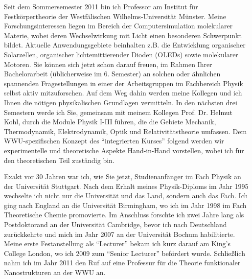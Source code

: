 \begin{multicols}{2}
Seit dem Sommersemester 2011 bin ich Professor am Institut für Festkörpertheorie der Westfälischen Wilhelms-Universität Münster. Meine Forschungsinteressen liegen im Bereich der Computersimulation molekularer Materie, wobei deren Wechselwirkung mit Licht einen besonderen Schwerpunkt bildet.  Aktuelle Anwendungsgebiete beinhalten z.B. die Entwicklung organischer Solarzellen, organischer lichtemittierender Dioden (OLEDs) sowie molekularer Motoren. Sie können sich jetzt schon darauf freuen, im Rahmen Ihrer Bachelorarbeit (üblicherweise im 6. Semester) an solchen oder ähnlichen spannenden Fragestellungen in einer der Arbeitsgruppen im Fachbereich Physik selbst aktiv mitzuforschen. Auf dem Weg dahin werden meine Kollegen und ich Ihnen die nötigen physikalischen Grundlagen vermitteln. In den nächsten drei Semestern werde ich Sie, gemeinsam mit meinem Kollegen Prof. Dr. Helmut Kohl, durch die Module Physik I-III führen, die die Gebiete Mechanik, Thermodynamik, Elektrodynamik, Optik und Relativitätstheorie umfassen. Dem WWU-spezifischen Konzept des “integrierten Kurses” folgend werden wir experimentelle und theoretische Aspekte Hand-in-Hand vorstellen, wobei ich für den theoretischen Teil zuständig bin. 

Exakt vor 30 Jahren war ich, wie Sie jetzt, Studienanfänger im Fach Physik an der Universität Stuttgart. Nach dem Erhalt meines Physik-Diploms im Jahr 1995 wechselte ich nicht nur die Universität und das Land, sondern auch das Fach. Ich ging nach England an die Universität Birmingham, wo ich im Jahr 1998 im Fach Theoretische Chemie promovierte. Im Anschluss forschte ich zwei Jahre lang als Postdoktorand an der Universität Cambridge, bevor ich nach Deutschland zurückkehrte und mich im Jahr 2007 an der Universität Bochum habilitierte. Meine erste Festanstellung als “Lecturer” bekam ich kurz darauf am King’s College London, wo ich 2009 zum “Senior Lecturer” befördert wurde. Schließlich nahm ich im Jahr 2011 den Ruf auf eine Professur für die Theorie funktionaler Nanostrukturen an der WWU an.  

\end{multicols}

\begin{center}
\end{center}
\newpage

